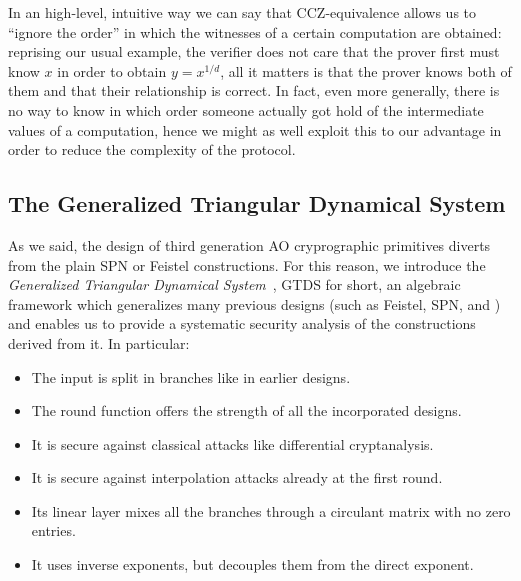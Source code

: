 In an high-level, intuitive way we can say that CCZ-equivalence allows us to ``ignore the order'' 
in which the witnesses of a certain computation are obtained: reprising our usual example,
the verifier does not care that the prover first must know \(x\) in order to obtain \(y = x^{1/d}\), 
all it matters is that the prover knows both of them and that their relationship is correct.
In fact, even more generally, there is no way to know in which order someone actually got hold of 
the intermediate values of a computation, hence we might as well exploit this to our advantage in 
order to reduce the complexity of the protocol.

\subsection{The Generalized Triangular Dynamical System}
As we said, the design of third generation AO cryprographic primitives diverts from the plain 
SPN or Feistel constructions.
For this reason, we introduce the \emph{Generalized Triangular Dynamical System}~\cite{RoyS2022}, 
GTDS for short, an algebraic framework which generalizes many previous designs (such as Feistel, 
SPN, and \Horst) and enables us to provide a systematic security analysis 
of the constructions derived from it.
In particular:
\begin{itemize}
  \item The input is split in branches like in earlier designs.
  \item The round function offers the strength of all the incorporated designs.
  \item It is secure against classical attacks like differential cryptanalysis.
  \item It is secure against interpolation attacks already at the first round.
  \item Its linear layer mixes all the branches through a circulant matrix with no zero entries.  
  \item It uses inverse exponents, but decouples them from the direct exponent. 
\end{itemize}

